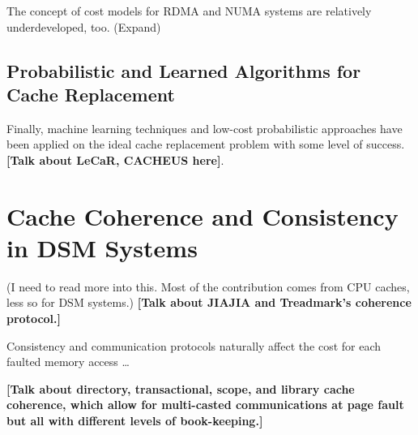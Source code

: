 \documentclass{article}
\begin{document}
The concept of cost models for RDMA and NUMA systems are relatively underdeveloped,
too. (Expand)

\subsection{Probabilistic and Learned Algorithms for Cache Replacement}
Finally, machine learning techniques and low-cost probabilistic approaches have
been applied on the ideal cache replacement problem with some level of success.
\textbf{[Talk about LeCaR, CACHEUS here]}.

\section{Cache Coherence and Consistency in DSM Systems}

(I need to read more into this. Most of the contribution comes from CPU caches,
less so for DSM systems.) \textbf{[Talk about JIAJIA and Treadmark's coherence
protocol.]}

Consistency and communication protocols naturally affect the cost for each faulted
memory access \dots

\textbf{[Talk about directory, transactional, scope, and library cache coherence,
which allow for multi-casted communications at page fault but all with different
levels of book-keeping.]}

\printbibliography
\end{document}
